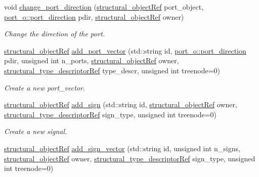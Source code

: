 \begin{DoxyCompactItemize}
void \hyperlink{classstructural__manager_a8925f8cfa41428e1221c2fead8ce10ec}{change\+\_\+port\+\_\+direction} (\hyperlink{structural__objects_8hpp_a8ea5f8cc50ab8f4c31e2751074ff60b2}{structural\+\_\+object\+Ref} port\+\_\+object, \hyperlink{structport__o_adb254df5665ff28b0769491cc3899fd5}{port\+\_\+o\+::port\+\_\+direction} pdir, \hyperlink{structural__objects_8hpp_a8ea5f8cc50ab8f4c31e2751074ff60b2}{structural\+\_\+object\+Ref} owner)
\begin{DoxyCompactList}\small\item\em Change the direction of the port. \end{DoxyCompactList}\item 
\hyperlink{structural__objects_8hpp_a8ea5f8cc50ab8f4c31e2751074ff60b2}{structural\+\_\+object\+Ref} \hyperlink{classstructural__manager_adbb58bf2d0c87da20466cf199a678b5b}{add\+\_\+port\+\_\+vector} (std\+::string id, \hyperlink{structport__o_adb254df5665ff28b0769491cc3899fd5}{port\+\_\+o\+::port\+\_\+direction} pdir, unsigned int n\+\_\+ports, \hyperlink{structural__objects_8hpp_a8ea5f8cc50ab8f4c31e2751074ff60b2}{structural\+\_\+object\+Ref} owner, \hyperlink{structural__objects_8hpp_a219296792577e3292783725961506c83}{structural\+\_\+type\+\_\+descriptor\+Ref} type\+\_\+descr, unsigned int treenode=0)
\begin{DoxyCompactList}\small\item\em Create a new port\+\_\+vector. \end{DoxyCompactList}\item 
\hyperlink{structural__objects_8hpp_a8ea5f8cc50ab8f4c31e2751074ff60b2}{structural\+\_\+object\+Ref} \hyperlink{classstructural__manager_a4a530daa9384ecd10119e11500bc3cd8}{add\+\_\+sign} (std\+::string id, \hyperlink{structural__objects_8hpp_a8ea5f8cc50ab8f4c31e2751074ff60b2}{structural\+\_\+object\+Ref} owner, \hyperlink{structural__objects_8hpp_a219296792577e3292783725961506c83}{structural\+\_\+type\+\_\+descriptor\+Ref} sign\+\_\+type, unsigned int treenode=0)
\begin{DoxyCompactList}\small\item\em Create a new signal. \end{DoxyCompactList}\item 
\hyperlink{structural__objects_8hpp_a8ea5f8cc50ab8f4c31e2751074ff60b2}{structural\+\_\+object\+Ref} \hyperlink{classstructural__manager_a822fbb21039617033cdaf45842738804}{add\+\_\+sign\+\_\+vector} (std\+::string id, unsigned int n\+\_\+signs, \hyperlink{structural__objects_8hpp_a8ea5f8cc50ab8f4c31e2751074ff60b2}{structural\+\_\+object\+Ref} owner, \hyperlink{structural__objects_8hpp_a219296792577e3292783725961506c83}{structural\+\_\+type\+\_\+descriptor\+Ref} sign\+\_\+type, unsigned int treenode=0)

\end{DoxyCompactItemize}
